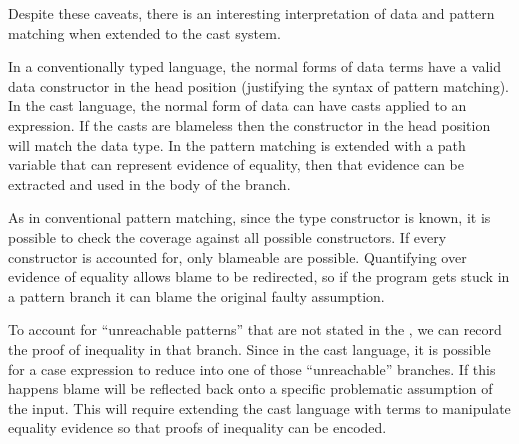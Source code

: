 Despite these caveats, there is an interesting interpretation of data and pattern matching when extended to the cast system.
 
In a conventionally typed language, the normal forms of data terms have a valid data constructor in the head position (justifying the syntax of pattern matching).
In the cast language, the normal form of data can have casts applied to an expression.
If the casts are blameless then the constructor in the head position will match the data type.
In the \clang{} pattern matching is extended with a path variable that can represent evidence of equality, then that evidence can be extracted and used in the body of the branch.
 
As in conventional pattern matching, since the type constructor is known, it is possible to check the coverage against all possible constructors.
If every constructor is accounted for, only blameable \scruts{} are possible.
Quantifying over evidence of equality allows blame to be redirected, so if the program gets stuck in a pattern branch it can blame the original faulty assumption.
 
To account for ``unreachable patterns'' that are not stated in the \slang, we can record the proof of inequality in that branch.
Since in the cast language, it is possible for a case expression to reduce into one of those ``unreachable'' branches.
If this happens blame will be reflected back onto a specific problematic assumption of the input.
This will require extending the cast language with terms to manipulate equality evidence so that proofs of inequality can be encoded.
 









% 


